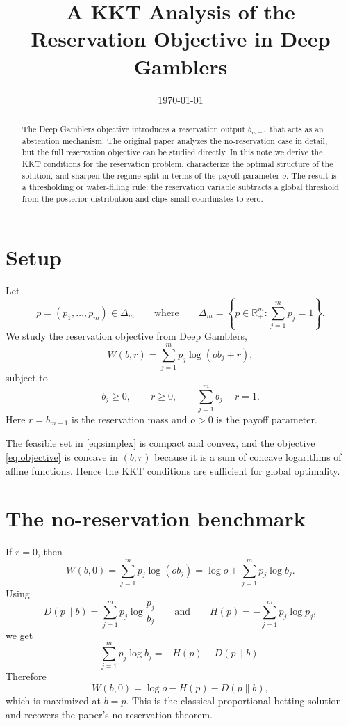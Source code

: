 \documentclass[11pt]{article}
\title{A KKT Analysis of the Reservation Objective in Deep Gamblers}
\author{}
\date{\today}
\theoremstyle{remark}
\begin{document}
\maketitle

\begin{abstract}
The Deep Gamblers objective introduces a reservation output $b_{m+1}$ that acts as an abstention mechanism.
The original paper analyzes the no-reservation case in detail, but the full reservation objective can be studied directly.
In this note we derive the KKT conditions for the reservation problem, characterize the optimal structure of the solution, and sharpen the regime split in terms of the payoff parameter $o$.
The result is a thresholding or water-filling rule: the reservation variable subtracts a global threshold from the posterior distribution and clips small coordinates to zero.
\end{abstract}

\section{Setup}

Let
\[
p=(p_1,\dots,p_m)\in\Delta_m
\qquad\text{where}\qquad
\Delta_m=\left\{p\in\mathbb{R}_+^m:\sum_{j=1}^m p_j=1\right\}.
\]
We study the reservation objective from Deep Gamblers,
\begin{equation}
W(b,r)=\sum_{j=1}^{m} p_j \log(o b_j+r),
\label{eq:objective}
\end{equation}
subject to
\begin{equation}
b_j\ge 0,\qquad r\ge 0,\qquad \sum_{j=1}^{m} b_j+r=1.
\label{eq:simplex}
\end{equation}
Here $r=b_{m+1}$ is the reservation mass and $o>0$ is the payoff parameter.

The feasible set in \eqref{eq:simplex} is compact and convex, and the objective \eqref{eq:objective} is concave in $(b,r)$ because it is a sum of concave logarithms of affine functions. Hence the KKT conditions are sufficient for global optimality.

\section{The no-reservation benchmark}

If $r=0$, then
\[
W(b,0)=\sum_{j=1}^m p_j \log(o b_j)
=
\log o+\sum_{j=1}^m p_j \log b_j.
\]
Using
\[
D(p\|b)=\sum_{j=1}^m p_j\log\frac{p_j}{b_j}
\qquad\text{and}\qquad
H(p)=-\sum_{j=1}^m p_j\log p_j,
\]
we get
\[
\sum_{j=1}^m p_j\log b_j
=
-H(p)-D(p\|b).
\]
Therefore
\[
W(b,0)=\log o-H(p)-D(p\|b),
\]
which is maximized at $b=p$. This is the classical proportional-betting solution and recovers the paper's no-reservation theorem.
\end{document}
